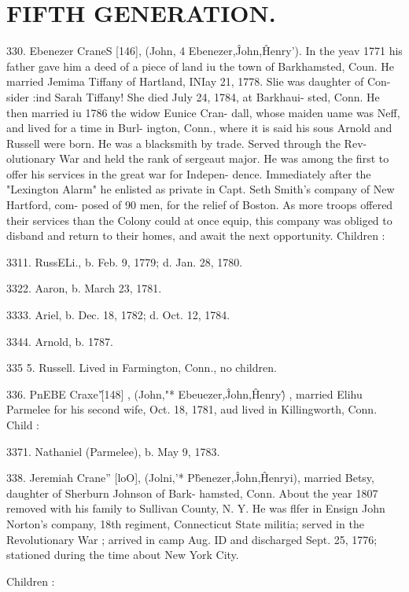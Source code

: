 \section{FIFTH GENERATION.}


330. Ebenezer CraneS [146], (John, 4 Ebenezer,\^ John,\^ 
Henry'). In the yeav 1771 his father gave him a deed of a piece 
of land iu the town of Barkhamsted, Coun. He married Jemima 
Tiffany of Hartland, INIay 21, 1778. Slie was daughter of Con- 
sider :ind Sarah Tiffany! She died July 24, 1784, at Barkhaui- 
sted, Conn. He then married iu 1786 the widow Eunice Cran- 
dall, whose maiden uame was Neff, and lived for a time in Burl- 
ington, Conn., where it is said his sous Arnold and Russell were 
born. He was a blacksmith by trade. Served through the Rev- 
olutionary War and held the rank of sergeaut major. He was 
among the first to offer his services in the great war for Indepen- 
dence. Immediately after the "Lexington Alarm" he enlisted 
as private in Capt. Seth Smith's company of New Hartford, com- 
posed of 90 men, for the relief of Boston. As more troops 
offered their services than the Colony could at once equip, this 
company was obliged to disband and return to their homes, and 
await the next opportunity. Children : 

3311. RussELi., b. Feb. 9, 1779; d. Jan. 28, 1780. 

3322. Aaron, b. March 23, 1781. 

3333. Ariel, b. Dec. 18, 1782; d. Oct. 12, 1784. 

3344. Arnold, b. 1787. 

335  5. Russell. Lived in Farmington, Conn., no children. 

336. PnEBE Craxe'\^ [148] , (John,"* Ebeuezer,\^ John,\^ Henry\^ ) , 
married Elihu Parmelee for his second wife, Oct. 18, 1781, aud 
lived in Killingworth, Conn. Child : 

3371. Nathaniel (Parmelee), b. May 9, 1783. 

338. Jeremiah Crane'' [loO], (Jolni,'* P\^benezer,\^ John,\^ 
Henryi), married Betsy, daughter of Sherburn Johnson of Bark- 
hamsted, Conn. About the year 1807 removed with his family 
to Sullivan County, N. Y. He was flfer in Ensign John Norton's 
company, 18th regiment, Connecticut State militia; served in the 
Revolutionary War ; arrived in camp Aug. ID and discharged 
Sept. 25, 1776; stationed during the time about New York City. 

Children : 



